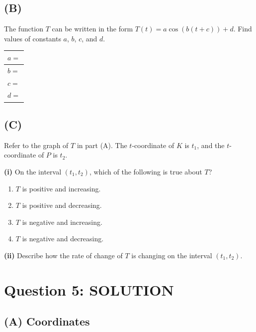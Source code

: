 \documentclass[11pt]{article}
\begin{document}
\subsection*{(B)}
The function $T$ can be written in the form $T(t) = a \cos(b(t + c)) + d$. Find values of constants $a$, $b$, $c$, and $d$.

\begin{center}
\begin{tabular}{|l|}
\hline
$a = $ \underline{\hspace{3cm}} \\[10pt]
\hline
$b = $ \underline{\hspace{3cm}} \\[10pt]
\hline
$c = $ \underline{\hspace{3cm}} \\[10pt]
\hline
$d = $ \underline{\hspace{3cm}} \\[10pt]
\hline
\end{tabular}
\end{center}

\subsection*{(C)}
Refer to the graph of $T$ in part (A). The $t$-coordinate of $K$ is $t_1$, and the $t$-coordinate of $P$ is $t_2$.

\textbf{(i)} On the interval $(t_1, t_2)$, which of the following is true about $T$?

\begin{enumerate}[label=\alph*., leftmargin=1.5cm]
    \item $T$ is positive and increasing.
    \item $T$ is positive and decreasing.
    \item $T$ is negative and increasing.
    \item $T$ is negative and decreasing.
\end{enumerate}

\vspace{0.5cm}
\textbf{(ii)} Describe how the rate of change of $T$ is changing on the interval $(t_1, t_2)$.

\newpage

\section*{Question 5: SOLUTION}

\subsection*{(A) Coordinates}
\end{document}
